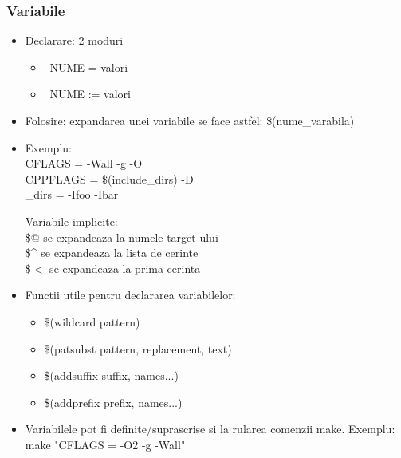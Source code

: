 \documentclass{beamer}
\begin{document}
    \begin{frame}[allowframebreaks]
    \frametitle{Variabile}
    \begin{itemize}
    \setlength{\itemsep}{0.5cm}
    \item Declarare: 2 moduri\\
        \begin{itemize}
        \item {\ttfamily\ NUME = valori}
        \item {\ttfamily\ NUME := valori}
        \end{itemize}
    \item Folosire: expandarea unei variabile se face astfel: {\ttfamily\$(nume\_varabila)}
    \item Exemplu:\\{\ttfamily CFLAGS = -Wall -g -O\\CPPFLAGS = \$(include\_dirs) -D\\_dirs = -Ifoo -Ibar}
    \begin{item}
    Variabile implicite:\\
    \$@ se expandeaza la numele target-ului\\
    \$\^{} se expandeaza la lista de cerinte\\
    \$$<$ se expandeaza la prima cerinta
    \end{item}
    \item Functii utile pentru declararea variabilelor:\\\begin{itemize}\item \$(wildcard pattern)\item \$(patsubst pattern, replacement, text)\item \$(addsuffix suffix, names...)\item \$(addprefix prefix, names...)\end{itemize}
    \item Variabilele pot fi definite/suprascrise si la rularea comenzii make. Exemplu:\\{\ttfamily make "CFLAGS = -O2 -g -Wall"}
    \end{itemize}
    \end{frame}
\end{document}

